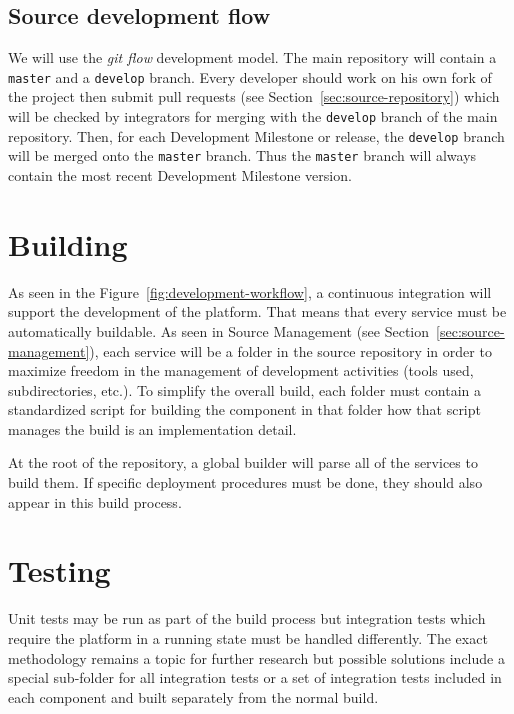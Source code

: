 \subsection{Source development flow}
\label{sec:source-development-flow}

We will use the \emph{git flow}\cite{kreeftmeijer:2010} development model. The main repository will
contain a \texttt{master} and a \texttt{develop} branch. Every developer should work on his
own fork of the project then submit pull requests (see Section~\ref{sec:source-repository})
which will be checked by integrators for merging with the \texttt{develop} branch of the main
repository. Then, for each Development Milestone or release, the \texttt{develop} branch will
be merged onto the \texttt{master} branch. Thus the \texttt{master} branch will always contain
the most recent Development Milestone version.

\section{Building}
\label{sec:building}

As seen in the Figure~\ref{fig:development-workflow}, a continuous integration will support the
development of the platform. That means that every service must be automatically buildable.
As seen in Source Management (see Section~\ref{sec:source-management}), each service will be a
folder in the source repository in order to maximize freedom in the management of development
activities (tools used, subdirectories, etc.). To simplify the overall build, each folder must
contain a standardized script for building the component in that folder how that script manages
the build is an implementation detail.

At the root of the repository, a global builder will parse all of the services to build them.
If specific deployment procedures must be done, they should also appear in this build process.

\section{Testing}
\label{sec:testing}

Unit tests may be run as part of the build process but integration tests which require the
\learnpad platform in a running state must be handled differently. The exact methodology
remains a topic for further research but possible solutions include a special sub-folder
for all integration tests or a set of integration tests included in each component and built
separately from the normal build.
